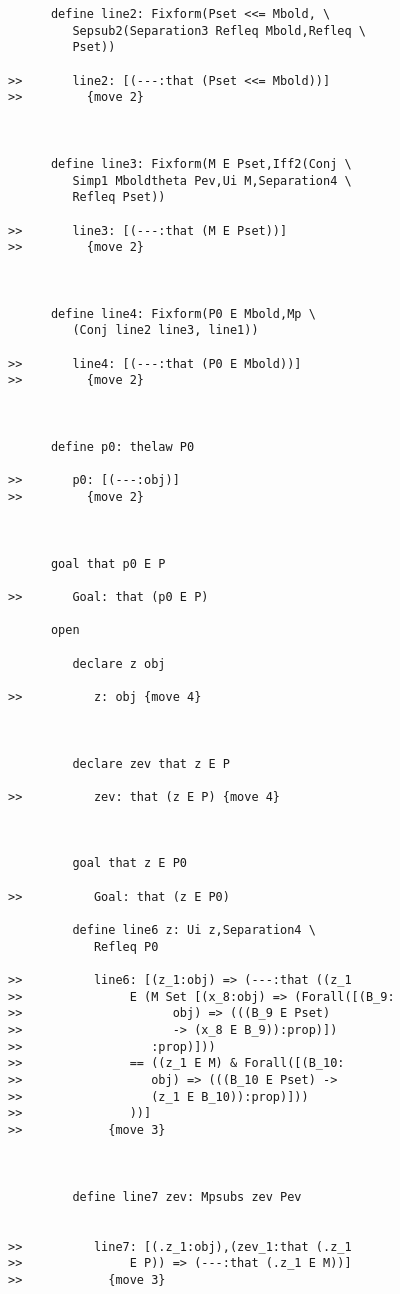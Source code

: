 \documentclass[12pt]{article}
\begin{document}
\begin{verbatim}
      define line2: Fixform(Pset <<= Mbold, \
         Sepsub2(Separation3 Refleq Mbold,Refleq \
         Pset))

>>       line2: [(---:that (Pset <<= Mbold))]
>>         {move 2}



      define line3: Fixform(M E Pset,Iff2(Conj \
         Simp1 Mboldtheta Pev,Ui M,Separation4 \
         Refleq Pset))

>>       line3: [(---:that (M E Pset))]
>>         {move 2}



      define line4: Fixform(P0 E Mbold,Mp \
         (Conj line2 line3, line1))

>>       line4: [(---:that (P0 E Mbold))]
>>         {move 2}



      define p0: thelaw P0

>>       p0: [(---:obj)]
>>         {move 2}



      goal that p0 E P

>>       Goal: that (p0 E P)

      open

         declare z obj

>>          z: obj {move 4}



         declare zev that z E P

>>          zev: that (z E P) {move 4}



         goal that z E P0

>>          Goal: that (z E P0)

         define line6 z: Ui z,Separation4 \
            Refleq P0

>>          line6: [(z_1:obj) => (---:that ((z_1
>>               E (M Set [(x_8:obj) => (Forall([(B_9:
>>                     obj) => (((B_9 E Pset)
>>                     -> (x_8 E B_9)):prop)])
>>                  :prop)]))
>>               == ((z_1 E M) & Forall([(B_10:
>>                  obj) => (((B_10 E Pset) ->
>>                  (z_1 E B_10)):prop)]))
>>               ))]
>>            {move 3}



         define line7 zev: Mpsubs zev Pev


>>          line7: [(.z_1:obj),(zev_1:that (.z_1
>>               E P)) => (---:that (.z_1 E M))]
>>            {move 3}




\end{verbatim}
\end{document}
